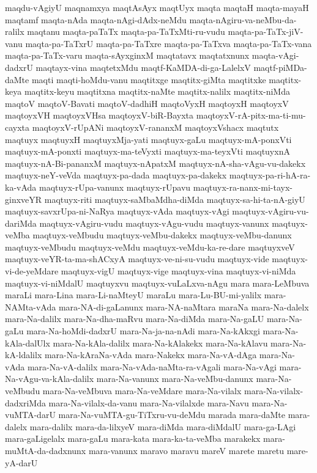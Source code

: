{maqdu-vAgiyU
maqnamxya
maqtAsAyx
maqtUyx
maqta
maqtaH
maqta-mayaH
maqtamf
maqta-nAda
maqta-nAgi-dAdx-neMdu
maqta-nAgiru-va-neMbu-da-ralilx
maqtanu
maqta-paTaTx
maqta-pa-TaTxMti-ru-vudu
maqta-pa-TaTx-jiV-vanu
maqta-pa-TaTxrU
maqta-pa-TaTxre
maqta-pa-TaTxva
maqta-pa-TaTx-vana
maqta-pa-TaTx-varu
maqta-sAyxginxM
maqtatavx
maqtatxnunx
maqta-vAgi-dadxrU
maqtayx-vina
maqtetxMdu
maqtf-KaMDA-di-ga-LalelxV
maqtf-piMDa-daMte
maqti
maqti-hoMdu-vanu
maqtitxge
maqtitx-giMta
maqtitxke
maqtitx-keya
maqtitx-keyu
maqtitxna
maqtitx-naMte
maqtitx-nalilx
maqtitx-niMda
maqtoV
maqtoV-Bavati
maqtoV-dadhiH
maqtoVyxH
maqtoyxH
maqtoyxV
maqtoyxVH
maqtoyxVHsa
maqtoyxV-biR-Bayxta
maqtoyxV-rA-pitx-ma-ti-mu-cayxta
maqtoyxV-rUpANi
maqtoyxV-rananxM
maqtoyxVshacx
maqtutx
maqtuyx
maqtuyxH
maqtuyxMja-yati
maqtuyx-gaLu
maqtuyx-mA-ponxVti
maqtuyx-mA-ponxti
maqtuyx-ma-teVyxti
maqtuyx-ma-teyxVti
maqtuyxnA
maqtuyx-nA-Bi-pananxM
maqtuyx-nApatxM
maqtuyx-nA-sha-vAgu-vu-dakekx
maqtuyx-neY-veVda
maqtuyx-pa-dada
maqtuyx-pa-dakekx
maqtuyx-pa-ri-hA-ra-ka-vAda
maqtuyx-rUpa-vanunx
maqtuyx-rUpavu
maqtuyx-ra-nanx-mi-tayx-ginxveYR
maqtuyx-riti
maqtuyx-saMbaMdha-diMda
maqtuyx-sa-hi-ta-nA-giyU
maqtuyx-savxrUpa-ni-NaRya
maqtuyx-vAda
maqtuyx-vAgi
maqtuyx-vAgiru-vu-dariMda
maqtuyx-vAgiru-vudu
maqtuyx-vAgu-vudu
maqtuyx-vanunx
maqtuyx-veMba
maqtuyx-veMbudu
maqtuyx-veMbu-dakekx
maqtuyx-veMbu-danunx
maqtuyx-veMbudu
maqtuyx-veMdu
maqtuyx-veMdu-ka-re-dare
maqtuyxveV
maqtuyx-veYR-ta-ma-shACxyA
maqtuyx-ve-ni-su-vudu
maqtuyx-vide
maqtuyx-vi-de-yeMdare
maqtuyx-vigU
maqtuyx-vige
maqtuyx-vina
maqtuyx-vi-niMda
maqtuyx-vi-niMdalU
maqtuyxvu
maqtuyx-vuLaLxva-nAgu
mara
mara-LeMbuva
maraLi
mara-Lina
mara-Li-naMteyU
maraLu
mara-Lu-BU-mi-yalilx
mara-NAMta-vAda
mara-NA-di-gaLanunx
mara-NA-naMtara
maraNa
mara-Na-dalelx
mara-Na-dalilx
mara-Na-dha-maRvu
mara-Na-diMda
mara-Na-gaLU
mara-Na-gaLu
mara-Na-hoMdi-dadxrU
mara-Na-ja-na-nAdi
mara-Na-kAkxgi
mara-Na-kAla-dalUlx
mara-Na-kAla-dalilx
mara-Na-kAlakekx
mara-Na-kAlavu
mara-Na-kA-ldalilx
mara-Na-kAraNa-vAda
mara-Nakekx
mara-Na-vA-dAga
mara-Na-vAda
mara-Na-vA-dalilx
mara-Na-vAda-naMta-ra-vAgali
mara-Na-vAgi
mara-Na-vAgu-va-kAla-dalilx
mara-Na-vanunx
mara-Na-veMbu-danunx
mara-Na-veMbudu
mara-Na-veMbuva
mara-Na-veMdare
mara-Na-vilalx
mara-Na-vilalx-dadxriMda
mara-Na-vilalx-da-vanu
mara-Na-vilalxde
mara-Navu
mara-Na-vuMTA-darU
mara-Na-vuMTA-gu-TiTxru-vu-deMdu
marada
mara-daMte
mara-dalelx
mara-dalilx
mara-da-lilxyeV
mara-diMda
mara-diMdalU
mara-ga-LAgi
mara-gaLigelalx
mara-gaLu
mara-kata
mara-ka-ta-veMba
marakekx
mara-muMtA-da-dadxnunx
mara-vanunx
maravo
maravu
mareV
marete
maretu
mare-yA-darU
}
